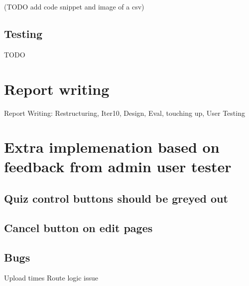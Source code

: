 \documentclass{article}
\begin{document}
(TODO add code snippet and image of a csv)
\subsection{Testing}
TODO
\newpage

\section{Report writing}
Report Writing: Restructuring, Iter10, Design, Eval, touching up, User Testing 
\newpage

\section{Extra implemenation based on feedback from admin user tester}
\subsection{Quiz control buttons should be greyed out}
\subsection{Cancel button on edit pages}
\subsection{Bugs}
Upload times
Route logic issue


%
%
\end{document}
